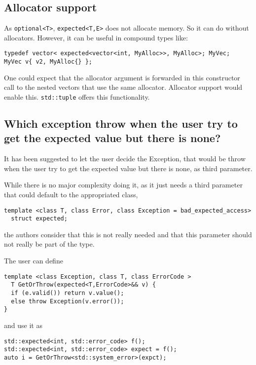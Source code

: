 \documentclass[a4paper,10pt]{article}
\newcommand{\cpp}[1]{\lstinline{#1}}
\begin{document}
\subsection{Allocator support}

As \cpp{optional<T>},  \cpp{expected<T,E>} does not allocate memory. So it can do without allocators. However, it can be useful in compound types like:

\begin{lstlisting}
typedef vector< expected<vector<int, MyAlloc>>, MyAlloc>; MyVec;
MyVec v{ v2, MyAlloc{} };
\end{lstlisting}

One could expect that the allocator argument is forwarded in this constructor call to the nested vectors that use the same allocator. Allocator support would enable this. \cpp{std::tuple} offers this functionality.

\subsection{Which exception throw when the user try to get the expected value but there is none?}

It has been suggested to let the user decide the Exception, that would be throw when the user try to get the expected value but there is none, as third parameter. 

While there is no major complexity doing it, as it just needs a third parameter that could default to the appropriated class, 

\begin{lstlisting}
template <class T, class Error, class Exception = bad_expected_access>
  struct expected;
\end{lstlisting}

the authors consider that this is not really needed and that this parameter should not really be part of the type.

The user can define

\begin{lstlisting}
template <class Exception, class T, class ErrorCode >
  T GetOrThrow(expected<T,ErrorCode>&& v) {
  if (e.valid()) return v.value();
  else throw Exception(v.error());
}
\end{lstlisting}

and use it as

\begin{lstlisting}
std::expected<int, std::error_code> f();
std::expected<int, std::error_code> expect = f();
auto i = GetOrThrow<std::system_error>(expct);  
\end{lstlisting}
\end{document}
